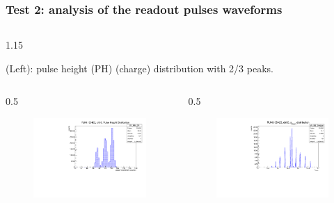 \documentclass{beamer}
\begin{document}
\begin{frame}
    \frametitle{Test 2: analysis of the readout pulses waveforms}
    \vspace{-4mm}
    \begin{columns}
\begin{column}{1.15\framewidth}
    \setlength{\leftmargini}{1.2em}
 \begin{itemize}
{\small \item (Left): pulse height (PH) (charge) distribution with 2/3 peaks.}
  \end{itemize}
    \end{column}
    \end{columns}
        \vspace{-3mm}
    \begin{columns}
\begin{column}{0.5\framewidth}
         \begin{figure}[!h]
      \centering
      \hspace*{-2em}
      \includegraphics[width=0.9\columnwidth]{figures/pdf/pulseheight.pdf}
     \label{fig:normalhits}
\end{figure}
\end{column}
\begin{column}{0.5\framewidth}
      \begin{figure}[!h]
      \centering
            \hspace*{-1em}
\includegraphics[width=0.9\columnwidth]{figures/pdf/tmean1.pdf}

\end{figure}
\end{column}
\end{columns}
\end{frame}
\end{document}
